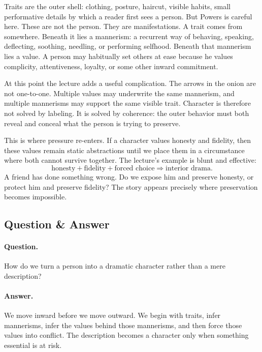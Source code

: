 Traits are the outer shell: clothing, posture, haircut, visible habits, small performative details by which a reader first sees a person. But Powers is careful here. These are not the person. They are manifestations. A trait comes from somewhere. Beneath it lies a mannerism: a recurrent way of behaving, speaking, deflecting, soothing, needling, or performing selfhood. Beneath that mannerism lies a value. A person may habitually set others at ease because he values complicity, attentiveness, loyalty, or some other inward commitment.

At this point the lecture adds a useful complication. The arrows in the onion are not one-to-one. Multiple values may underwrite the same mannerism, and multiple mannerisms may support the same visible trait. Character is therefore not solved by labeling. It is solved by coherence: the outer behavior must both reveal and conceal what the person is trying to preserve.

This is where pressure re-enters. If a character values honesty and fidelity, then these values remain static abstractions until we place them in a circumstance where both cannot survive together. The lecture's example is blunt and effective:
\begin{equation}
\text{honesty} + \text{fidelity} + \text{forced choice} \Rightarrow \text{interior drama}.
\end{equation}
A friend has done something wrong. Do we expose him and preserve honesty, or protect him and preserve fidelity? The story appears precisely where preservation becomes impossible.

\subsection{Question \& Answer}

\paragraph{Question.} How do we turn a person into a dramatic character rather than a mere description?

\paragraph{Answer.} We move inward before we move outward. We begin with traits, infer mannerisms, infer the values behind those mannerisms, and then force those values into conflict. The description becomes a character only when something essential is at risk.

